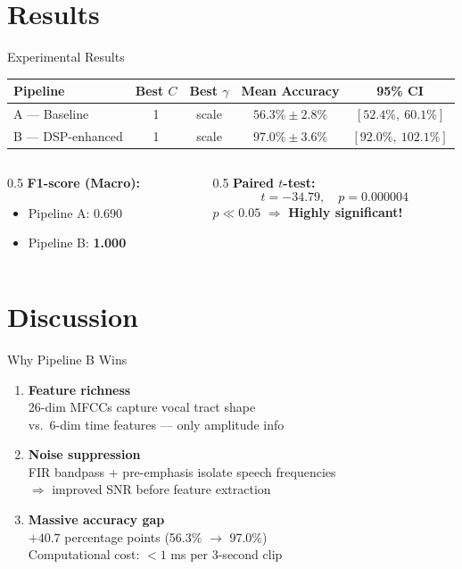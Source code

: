 \documentclass[aspectratio=169]{beamer}
\begin{document}
\section{Results}
\begin{frame}{Experimental Results}
\begin{table}
\centering
\large
\begin{tabular}{lcccc}
\toprule
\textbf{Pipeline} & \textbf{Best $C$} & \textbf{Best $\gamma$} & \textbf{Mean Accuracy} & \textbf{95\% CI} \\
\midrule
A — Baseline     & 1  & scale & $56.3\% \pm 2.8\%$ & $[52.4\%,\ 60.1\%]$ \\
B — DSP-enhanced & 1  & scale & $\mathbf{97.0\% \pm 3.6\%}$ & $[92.0\%,\ 102.1\%]$ \\
\bottomrule
\end{tabular}
\end{table}

\vspace{0.4cm}
\begin{columns}
\begin{column}{0.5\textwidth}
\textbf{F1-score (Macro):}
\begin{itemize}
    \item Pipeline A: 0.690
    \item Pipeline B: \textbf{1.000}
\end{itemize}
\end{column}
\begin{column}{0.5\textwidth}
\textbf{Paired $t$-test:}
$$t = -34.79,\quad p = 0.000004$$
$p \ll 0.05$ $\Rightarrow$ \textbf{Highly significant!}
\end{column}
\end{columns}
\end{frame}

\section{Discussion}
\begin{frame}{Why Pipeline B Wins}
\begin{enumerate}
    \item \textbf{Feature richness}\\
    26-dim MFCCs capture vocal tract shape\\
    vs.\ 6-dim time features — only amplitude info

    \vspace{0.4cm}
    \item \textbf{Noise suppression}\\
    FIR bandpass + pre-emphasis isolate speech frequencies\\
    $\Rightarrow$ improved SNR before feature extraction

    \vspace{0.4cm}
    \item \textbf{Massive accuracy gap}\\
    $+40.7$ percentage points (56.3\% $\rightarrow$ 97.0\%)\\
    Computational cost: $<1$ ms per 3-second clip
\end{enumerate}
\end{frame}
\end{document}
